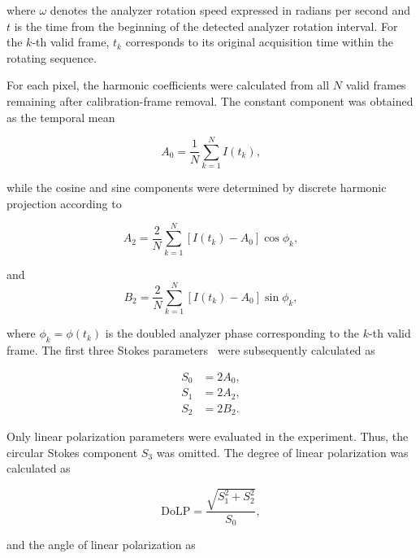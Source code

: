 \documentclass[pdflatex,sn-apa]{sn-jnl}
\begin{document}
\noindent
where $\omega$ denotes the analyzer rotation speed expressed in radians per second and $t$ is the time from the beginning of the detected analyzer rotation interval. For the $k$-th valid frame, $t_k$ corresponds to its original acquisition time within the rotating sequence. 


For each pixel, the harmonic coefficients were calculated from all $N$ valid frames remaining after calibration-frame removal. The constant component was obtained as the temporal mean

\begin{equation}
 A_0=\frac{1}{N}\sum_{k=1}^{N} I(t_k),
 \label{eq:A0}
\end{equation}

\noindent
while the cosine and sine components were determined by discrete harmonic projection according to

\begin{equation}
 A_2 = \frac{2}{N}\sum_{k=1}^{N}\left[I(t_k)-A_0\right]\cos\phi_k,
\end{equation}

\noindent
and
\begin{equation} 
 B_2 = \frac{2}{N}\sum_{k=1}^{N}\left[I(t_k)-A_0\right]\sin\phi_k,
 \label{eq:harmonic_coefficients}
\end{equation}

\noindent
where $\phi_k=\phi(t_k)$ is the doubled analyzer phase corresponding to the $k$-th valid frame. The first three Stokes parameters~\citep{Schaefer2007} were subsequently calculated as

\begin{align}
 S_0 &= 2A_0, \\
 S_1 &= 2A_2, \\
 S_2 &= 2B_2.
 \label{eq:stokes}
\end{align}

\noindent
Only linear polarization parameters were evaluated in the experiment. Thus, the circular Stokes component $S_3$ was omitted. The degree of linear polarization was calculated as

\begin{equation}
 \mathrm{DoLP}=\frac{\sqrt{S_1^2+S_2^2}}{S_0},
 \label{eq:dolp}
\end{equation}

\noindent
and the angle of linear polarization as
\end{document}
